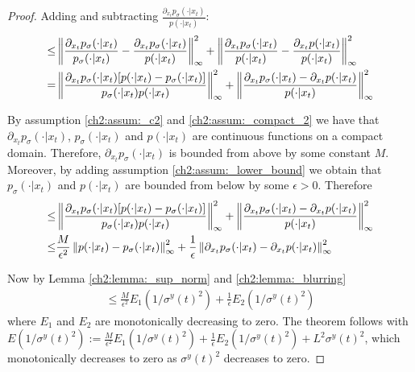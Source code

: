 \begin{proof}
    Adding and subtracting $\frac{\partial_{x_t} p_{\sigma}( \cdot | x_t)}{ p( \cdot | x_t)} $:
    \begin{align*}
        \leq &\left\lVert  
            \frac{\partial_{x_t} p_{\sigma}( \cdot | x_t)}{ p_{\sigma}( \cdot | x_t)}  
            - \frac{\partial_{x_t} p_{\sigma}( \cdot | x_t)}{ p( \cdot | x_t)} 
         \right\rVert_{\infty}^2 
        +  \left\lVert  
            \frac{\partial_{x_t} p_{\sigma}( \cdot | x_t)}{ p( \cdot | x_t)}  
            - \frac{\partial_{x_t} p( \cdot | x_t)}{ p( \cdot | x_t)} 
         \right\rVert_{\infty}^2 
        \\
        = &\left\lVert  
            \frac{\partial_{x_t} p_{\sigma}( \cdot | x_t)[ p( \cdot | x_t) - p_{\sigma}( \cdot | x_t)]}
            { p_{\sigma}( \cdot | x_t) p( \cdot | x_t)}  
         \right\rVert_{\infty}^2 
        +  \left\lVert  
            \frac{\partial_{x_t} p_{\sigma}( \cdot | x_t) - \partial_{x_t} p( \cdot | x_t)}
            { p( \cdot | x_t)}  
         \right\rVert_{\infty}^2 
    \end{align*}
    
    By assumption \ref{ch2:assum:_c2} and \ref{ch2:assum:_compact_2} we have that $\partial_{x_t} p_{\sigma}( \cdot | x_t)$, $p_{\sigma}( \cdot | x_t)$ and  $p( \cdot | x_t)$ are continuous functions on a compact domain. Therefore, $\partial_{x_t} p_{\sigma}( \cdot | x_t)$ is bounded from above by some constant $M$. Moreover, by adding assumption \ref{ch2:assum:_lower_bound} we obtain that $p_{\sigma}( \cdot | x_t)$ and  $p( \cdot | x_t)$ are bounded from below by some $\epsilon > 0$. Therefore 
    \begin{align*}
        \leq &\left\lVert  
            \frac{\partial_{x_t} p_{\sigma}( \cdot | x_t)[ p( \cdot | x_t) - p_{\sigma}( \cdot | x_t)]}
            { p_{\sigma}( \cdot | x_t) p( \cdot | x_t)}  
         \right\rVert_{\infty}^2 
        +  \left\lVert  
            \frac{\partial_{x_t} p_{\sigma}( \cdot | x_t) - \partial_{x_t} p( \cdot | x_t)}
            { p( \cdot | x_t)}  
         \right\rVert_{\infty}^2 
        \\
        \leq &\frac{M}{\epsilon^2} \left\lVert  p( \cdot | x_t) - p_{\sigma}( \cdot | x_t)  \right\rVert_{\infty}^2 
        + \frac{1}{\epsilon} \left\lVert  \partial_{x_t} p_{\sigma}( \cdot | x_t) - \partial_{x_t} p( \cdot | x_t) \right\rVert_{\infty}^2 
    \end{align*}
    
    Now by Lemma \ref{ch2:lemma:_sup_norm} and \ref{ch2:lemma:_blurring}
    \begin{align*}
        \leq \frac{M}{\epsilon^2} E_1(1/\sigma^y(t)^2) + \frac{1}{\epsilon}  E_2(1/\sigma^y(t)^2)
    \end{align*}
    where $E_1$ and $E_2$ are monotonically decreasing to zero.
    The theorem follows with $E(1/\sigma^y(t)^2) := \frac{M}{\epsilon^2} E_1(1/\sigma^y(t)^2) + \frac{1}{\epsilon}  E_2(1/\sigma^y(t)^2) + L^2 \sigma^y(t)^2$, which monotonically decreases to zero as $\sigma^y(t)^2$ decreases to zero.
\end{proof}

